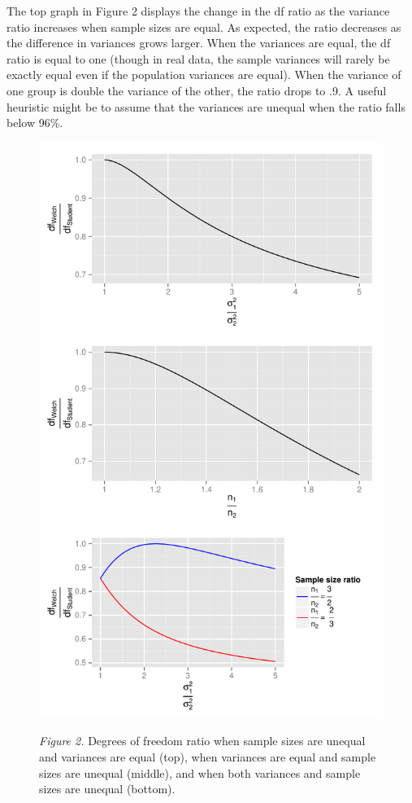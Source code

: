 \documentclass[man,a4paper,noextraspace,apacite]{apa6}
\begin{document}
    The top graph in Figure 2 displays the change in the df ratio as the variance ratio increases when sample sizes are equal. As expected, the ratio decreases as the difference in variances grows larger. When the variances are equal, the df ratio is equal to one (though in real data, the sample variances will rarely be exactly equal even if the population variances are equal). When the variance of one group is double the variance of the other, the ratio drops to .9. A useful heuristic might be to assume that the variances are unequal when the ratio falls below 96\%.
  
\begin{figure}
\includegraphics{WelchManuscript-MASTER-dfratiosDiffvars}

\textit{Figure 2.} Degrees of freedom ratio when sample sizes are unequal and variances are equal (top), when variances are equal and sample sizes are unequal (middle), and when both variances and sample sizes are unequal (bottom).
\end{figure}
\end{document}
